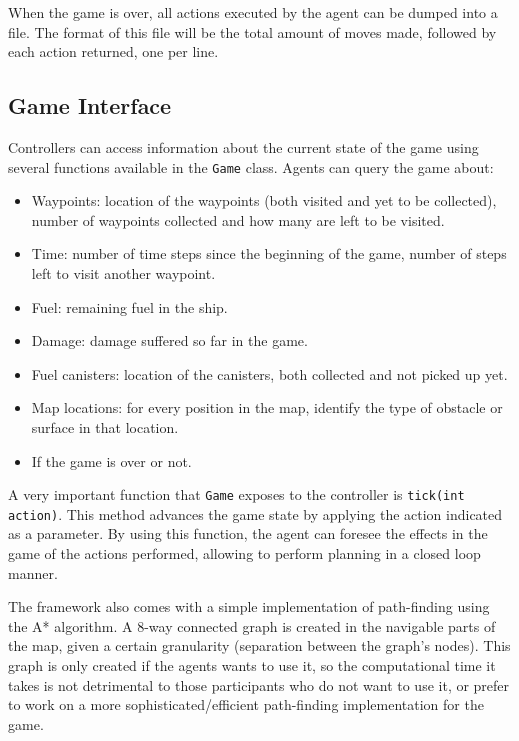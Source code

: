 \documentclass[conference]{IEEEtran}
\newcommand{\code}[1]{{\lstinline!#1!}}
\begin{document}
When the game is over, all actions executed by the agent can be dumped into a file. The format of this file will be the total amount of moves made, followed by each action returned, one per line.

\subsection{Game Interface} \label{ssec:cont}

Controllers can access information about the current state of the game using several functions available in the \code{Game} class. Agents can query the game about:

\begin{itemize}
\item Waypoints: location of the waypoints (both visited and yet to be collected), number of waypoints collected and how many are left to be visited.
\item Time: number of time steps since the beginning of the game, number of steps left to visit another waypoint.
\item Fuel: remaining fuel in the ship.
\item Damage: damage suffered so far in the game.
\item Fuel canisters: location of the canisters, both collected and not picked up yet.
\item Map locations: for every position in the map, identify the type of obstacle or surface in that location.
\item If the game is over or not.
\end{itemize}

A very important function that \code{Game} exposes to the controller is \code{tick(int action)}. This method advances the game state by applying the action indicated as a parameter. By using this function, the agent can foresee the effects in the game of the actions performed, allowing to perform planning in a closed loop manner. 

The framework also comes with a simple implementation of path-finding using the A* algorithm. A 8-way connected graph is created in the navigable parts of the map, given a certain granularity (separation between the graph's nodes). This graph is only created if the agents wants to use it, so the computational time it takes is not detrimental to those participants who do not want to use it, or prefer to work on a more sophisticated/efficient path-finding implementation for the game.
\end{document}
